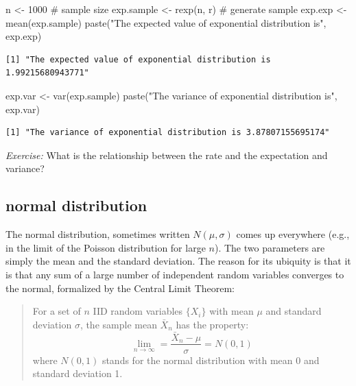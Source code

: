 \documentclass[
  letterpaper,
  DIV=11,
  numbers=noendperiod]{scrreprt}
\newenvironment{Shaded}{\begin{snugshade}}{\end{snugshade}}
\newcommand{\CommentTok}[1]{\textcolor[rgb]{0.37,0.37,0.37}{#1}}
\newcommand{\DecValTok}[1]{\textcolor[rgb]{0.68,0.00,0.00}{#1}}
\newcommand{\FunctionTok}[1]{\textcolor[rgb]{0.28,0.35,0.67}{#1}}
\newcommand{\NormalTok}[1]{\textcolor[rgb]{0.00,0.23,0.31}{#1}}
\newcommand{\OtherTok}[1]{\textcolor[rgb]{0.00,0.23,0.31}{#1}}
\newcommand{\StringTok}[1]{\textcolor[rgb]{0.13,0.47,0.30}{#1}}
\begin{document}
\begin{Shaded}
\begin{Highlighting}[]
\NormalTok{n }\OtherTok{\textless{}{-}} \DecValTok{1000} \CommentTok{\# sample size}
\NormalTok{exp.sample }\OtherTok{\textless{}{-}} \FunctionTok{rexp}\NormalTok{(n, r) }\CommentTok{\# generate sample}
\NormalTok{exp.exp }\OtherTok{\textless{}{-}} \FunctionTok{mean}\NormalTok{(exp.sample)}
\FunctionTok{paste}\NormalTok{(}\StringTok{"The expected value of exponential distribution is"}\NormalTok{, exp.exp)}
\end{Highlighting}
\end{Shaded}

\begin{verbatim}
[1] "The expected value of exponential distribution is 1.99215680943771"
\end{verbatim}

\begin{Shaded}
\begin{Highlighting}[]
\NormalTok{exp.var }\OtherTok{\textless{}{-}} \FunctionTok{var}\NormalTok{(exp.sample)}
\FunctionTok{paste}\NormalTok{(}\StringTok{"The variance of exponential distribution is"}\NormalTok{, exp.var)}
\end{Highlighting}
\end{Shaded}

\begin{verbatim}
[1] "The variance of exponential distribution is 3.87807155695174"
\end{verbatim}

\emph{Exercise:} What is the relationship between the rate and the
expectation and variance?

\hypertarget{normal-distribution}{%
\subsection{normal distribution}\label{normal-distribution}}

The normal distribution, sometimes written \(N(\mu, \sigma)\) comes up
everywhere (e.g., in the limit of the Poisson distribution for large
\(n\)). The two parameters are simply the mean and the standard
deviation. The reason for its ubiquity is that it is that any sum of a
large number of independent random variables converges to the normal,
formalized by the Central Limit Theorem:

\begin{quote}
For a set of \(n\) IID random variables \(\{X_i\}\) with mean \(\mu\)
and standard deviation \(\sigma\), the sample mean \(\bar X_n\) has the
property: \[
\lim_{n \to \infty} = \frac{\bar X_n - \mu}{\sigma} = N(0,1)
\] where \(N(0,1)\) stands for the normal distribution with mean 0 and
standard deviation 1.
\end{quote}
\end{document}
